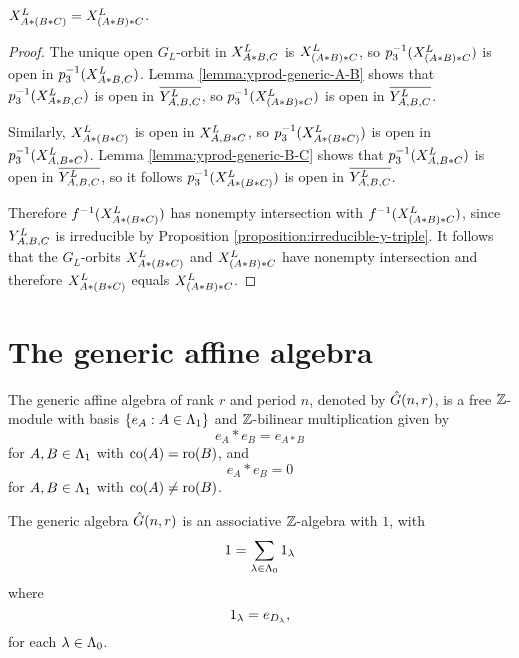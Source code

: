 \documentclass[a4paper, 11pt]{report}
\begin{document}
\begin{proposition}\label{proposition:associativity}
$\xprod[L]{A\ast (B\ast C)} = \xprod[L]{(A\ast B)\ast C}$.
\end{proposition}

\begin{proof}
The unique open $G_L$-orbit in $\xprod[L]{A\ast B, C}$ is $\xprod[L]{(A\ast B)\ast C}$, so $p_3^{-1}(\xprod[L]{(A\ast B)\ast C})$ is open in $p_3^{-1}(\xprod[L]{A\ast B,C})$. Lemma \ref{lemma:yprod-generic-A-B} shows that $p_3^{-1}(\xprod[L]{A\ast B,C})$ is open in $\overline{\yprod[L]{A,B,C}}$, so $p_3^{-1}(\xprod[L]{(A\ast B)\ast C})$ is open in $\overline{\yprod[L]{A,B,C}}$.

Similarly, $\xprod[L]{A\ast (B\ast C)}$ is open in $\xprod[L]{A,B\ast C}$, so $p_3^{-1}(\xprod[L]{A\ast (B\ast C)})$ is open in $p_3^{-1}(\xprod[L]{A,B\ast C})$. Lemma \ref{lemma:yprod-generic-B-C} shows that $p_3^{-1}(\xprod[L]{A,B\ast C})$ is open in $\overline{\yprod[L]{A,B,C}}$, so it follows $p_3^{-1}(\xprod[L]{A\ast (B\ast C)})$ is open in $\overline{\yprod[L]{A,B,C}}$.

Therefore $f^{-1}(\xprod[L]{A\ast (B\ast C)})$ has nonempty intersection with $f^{-1}(\xprod[L]{(A\ast B)\ast C})$, since $\yprod[L]{A,B,C}$ is irreducible by Proposition \ref{proposition:irreducible-y-triple}. It follows that the $G_L$-orbits $\xprod[L]{A\ast (B\ast C)}$ and $\xprod[L]{(A\ast B)\ast C}$ have nonempty intersection and therefore $\xprod[L]{A\ast (B\ast C)}$ equals $\xprod[L]{(A\ast B)\ast C}$.
\end{proof}


\section{The generic affine algebra}

The generic affine algebra of rank $r$ and period $n$, denoted by $\generic$, is a free $\integers$-module with basis $\{e_A:A\in\matrices\}$ and $\integers$-bilinear multiplication given by
\begin{equation*}
e_A\ast e_B = e_{A\ast B}
\end{equation*}
for $A,B\in\matrices$ with $\co{A}=\ro{B}$, and
\begin{equation*}
e_A\ast e_B = 0
\end{equation*}
for $A,B\in\matrices$ with $\co{A}\neq\ro{B}$.

\begin{proposition}
The generic algebra $\generic$ is an associative $\integers$-algebra with $1$, with
\begin{equation*}
1=\sum_{\lambda\in\compositions} 1_\lambda
\end{equation*}
where
\begin{equation*}
1_\lambda = e_{\diag{\lambda}},
\end{equation*}
for each $\lambda\in\compositions$.
\end{proposition}
\end{document}
